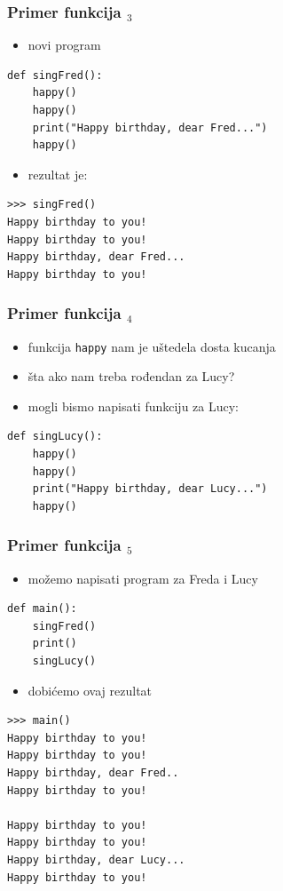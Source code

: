 \documentclass[utf8,compress]{beamer}
\begin{document}
\begin{frame}[fragile]
  \frametitle{Primer funkcija $_3$}
  \begin{itemize}
    \item novi program
  \end{itemize}
\begin{verbatim}
def singFred():
    happy()
    happy()
    print("Happy birthday, dear Fred...")
    happy()
\end{verbatim}
  \begin{itemize}
    \item rezultat je:
  \end{itemize}
\begin{verbatim}
>>> singFred()
Happy birthday to you!
Happy birthday to you!
Happy birthday, dear Fred...
Happy birthday to you!
\end{verbatim}
\end{frame}

\begin{frame}[fragile]
  \frametitle{Primer funkcija $_4$}
  \begin{itemize}
    \item funkcija \texttt{happy} nam je uštedela dosta kucanja
    \item šta ako nam treba rođendan za Lucy?
    \item mogli bismo napisati funkciju za Lucy:
  \end{itemize}
\begin{verbatim}
def singLucy():
    happy()
    happy()
    print("Happy birthday, dear Lucy...")
    happy()
\end{verbatim}
\end{frame}

\begin{frame}[fragile,shrink=10]
  \frametitle{Primer funkcija $_5$}
  \begin{itemize}
    \item možemo napisati program za Freda i Lucy
  \end{itemize}
\begin{verbatim}
def main():
    singFred()
    print()
    singLucy()
\end{verbatim}
  \begin{itemize}
    \item dobićemo ovaj rezultat
  \end{itemize}
\begin{verbatim}
>>> main()
Happy birthday to you!
Happy birthday to you!
Happy birthday, dear Fred..
Happy birthday to you!

Happy birthday to you!
Happy birthday to you!
Happy birthday, dear Lucy...
Happy birthday to you!
\end{verbatim}
\end{frame}
\end{document}
